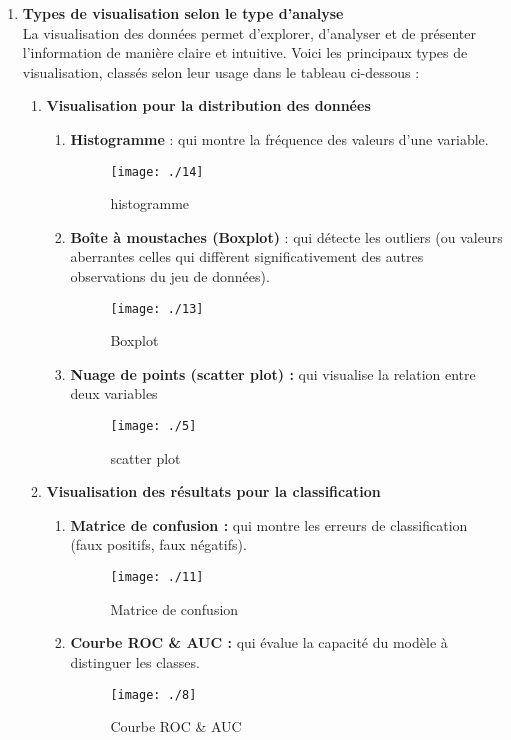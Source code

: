 \documentclass[a4paper, 12pt]{article}
\begin{document}
	\begin{enumerate}
		\item \justifying 	\textbf{Types de visualisation selon le type d’analyse}\\
		La visualisation des données permet d’explorer, d’analyser et de présenter l’information de manière claire et intuitive. Voici les principaux types de visualisation, classés selon leur usage dans le tableau ci-dessous :
		\begin{enumerate}\newpage
			\item \justifying \textbf{Visualisation pour la distribution des données}
			\begin{enumerate}
				\item \justifying \textbf{Histogramme }: qui montre la fréquence des valeurs d’une variable.
				\begin{figure}[h]
					\centering
					\texttt{[image: ./14]}
					\caption{histogramme}
				\end{figure}
				\item \justifying \textbf{ Boîte à moustaches (Boxplot)} : qui  détecte les outliers (ou valeurs aberrantes celles qui diffèrent significativement des autres observations du jeu de données).
				\begin{figure}[h]
					\centering
					\texttt{[image: ./13]}
					\caption{Boxplot}
				\end{figure}
				\item \justifying \textbf{ Nuage de points (scatter plot) :}  qui  visualise la relation entre deux variables
				\begin{figure}[h]
					\centering
					\texttt{[image: ./5]}
					\caption{scatter plot}
				\end{figure}
			\end{enumerate} \newpage
			\item \justifying \textbf{
				Visualisation des résultats pour la classification
			}
			\begin{enumerate}
				\item \justifying \textbf{Matrice de confusion :} qui  montre les erreurs de classification (faux positifs, faux négatifs).
				\begin{figure}[h]
					\centering
					\texttt{[image: ./11]}
					\caption{Matrice de confusion}
				\end{figure} 
			
				\item \justifying \textbf{Courbe ROC \& AUC :} qui  évalue la capacité du modèle à distinguer les classes.
			\begin{figure}[h]
				\centering
				\texttt{[image: ./8]}
				\caption{Courbe ROC \& AUC}
			\end{figure} 
			

\end{enumerate}
\end{enumerate}
\end{enumerate}
\end{document}
